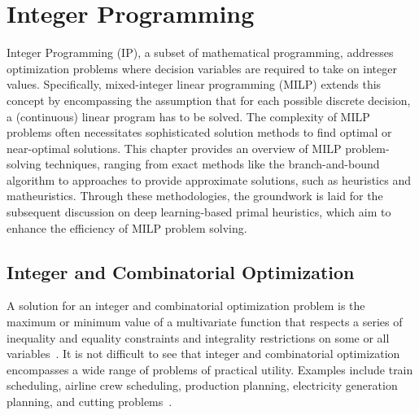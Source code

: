 

\chapter{Integer Programming}\label{chap:integer-programming}


Integer Programming (IP), a subset of mathematical programming, addresses optimization problems where decision variables are required to take on integer values.
Specifically, mixed-integer linear programming (MILP) extends this concept by encompassing the assumption that for each possible discrete decision, a (continuous) linear program has to be solved.
The complexity of MILP problems often necessitates sophisticated solution methods to find optimal or near-optimal solutions.
This chapter provides an overview of MILP problem-solving techniques, ranging from exact methods like the branch-and-bound algorithm to approaches to provide approximate solutions, such as heuristics and matheuristics.
Through these methodologies, the groundwork is laid for the subsequent discussion on deep learning-based primal heuristics, which aim to enhance the efficiency of MILP problem solving.

\section{Integer and Combinatorial Optimization}

A solution for an integer and combinatorial optimization problem is the maximum or minimum value of a multivariate function that respects a series of inequality and equality constraints and integrality restrictions on some or all variables~\cite{nemhauserIntegerCombinatorialOptimization1999}.
It is not difficult to see that integer and combinatorial optimization encompasses a wide range of problems of practical utility.
Examples include train scheduling, airline crew scheduling, production planning, electricity generation planning, and cutting problems~\cite{wolseyIntegerProgramming1998}.

